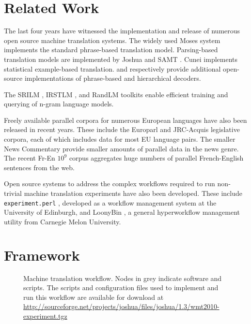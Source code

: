\documentclass[11pt]{article}
\begin{document}
\section{Related Work}
\label{Related Work}

The last four years have witnessed the implementation and release of numerous open source machine translation systems. The widely used Moses system implements the standard phrase-based translation model. Parsing-based translation models are implemented by Joshua \cite{Joshua-WMT} and SAMT \cite{samt2006}. Cunei \cite{Phillips2009} implements statistical example-based translation.  and  respectively provide additional open-source implementations of phrase-based and hierarchical decoders.

The SRILM \cite{Stolcke2002}, IRSTLM \cite{IRSTLM}, and RandLM \cite{Talbot2007a} toolkits enable efficient training and querying of n-gram language models. 

Freely available parallel corpora for numerous European languages have also been released in recent years. These include the Europarl \cite{Koehn-europarl} and JRC-Acquis \cite{Steinberger-2006} legislative corpora, each of which includes data for most EU language pairs. The smaller News Commentary \cite{Callison-Burch2007a,Callison-Burch2008a} provide smaller amounts of parallel data in the news genre. The recent Fr-En $10^9$ \cite{WMT09-Findings} corpus aggregates huge numbers of parallel French-English sentences from the web.

Open source systems to address the complex workflows required to run non-trivial machine translation experiments have also been developed. These include {\tt experiment.perl} \cite{experiment.perl}, developed as a workflow management system at the University of Edinburgh, and LoonyBin \cite{LoonyBin}, a general hyperworkflow management utility from Carnegie Melon University.








\section{Framework}
\label{Framework}

\begin{figure*}


\caption{Machine translation workflow. Nodes in grey indicate software and scripts. The scripts and configuration files used to implement and run this workflow are available for download at \url{http://sourceforge.net/projects/joshua/files/joshua/1.3/wmt2010-experiment.tgz}}
\end{figure*}
\end{document}
